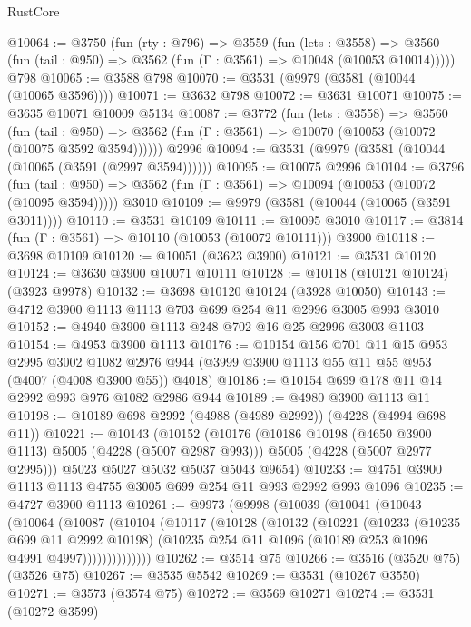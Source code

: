 \begin{lexlean}{RustCore}
\begin{coremodule}
@10064 := @3750
    (fun (rty : @796) =>
    @3559
      (fun (lets : @3558) =>
      @3560 (fun (tail : @950) => @3562 (fun (Γ : @3561) => @10048 (@10053 @10014)))))
    @798
@10065 := @3588 @798
@10070 := @3531 (@9979 (@3581 (@10044 (@10065 @3596))))
@10071 := @3632 @798
@10072 := @3631 @10071
@10075 := @3635 @10071 @10009 @5134
@10087 := @3772
    (fun (lets : @3558) =>
    @3560
      (fun (tail : @950) =>
      @3562 (fun (Γ : @3561) => @10070 (@10053 (@10072 (@10075 @3592 @3594))))))
    @2996
@10094 := @3531 (@9979 (@3581 (@10044 (@10065 (@3591 (@2997 @3594))))))
@10095 := @10075 @2996
@10104 := @3796
    (fun (tail : @950) => @3562 (fun (Γ : @3561) => @10094 (@10053 (@10072 (@10095 @3594)))))
    @3010
@10109 := @9979 (@3581 (@10044 (@10065 (@3591 @3011))))
@10110 := @3531 @10109
@10111 := @10095 @3010
@10117 := @3814 (fun (Γ : @3561) => @10110 (@10053 (@10072 @10111))) @3900
@10118 := @3698 @10109
@10120 := @10051 (@3623 @3900)
@10121 := @3531 @10120
@10124 := @3630 @3900 @10071 @10111
@10128 := @10118 (@10121 @10124) (@3923 @9978)
@10132 := @3698 @10120 @10124 (@3928 @10050)
@10143 := @4712 @3900 @1113 @1113 @703 @699 @254 @11 @2996 @3005 @993 @3010
@10152 := @4940 @3900 @1113 @248 @702 @16 @25 @2996 @3003 @1103
@10154 := @4953 @3900 @1113
@10176 := @10154
    @156
    @701
    @11
    @15
    @953
    @2995
    @3002
    @1082
    @2976
    @944
    (@3999 @3900 @1113 @55 @11 @55 @953 (@4007 (@4008 @3900 @55)) @4018)
@10186 := @10154 @699 @178 @11 @14 @2992 @993 @976 @1082 @2986 @944
@10189 := @4980 @3900 @1113 @11
@10198 := @10189 @698 @2992 (@4988 (@4989 @2992)) (@4228 (@4994 @698 @11))
@10221 := @10143
    (@10152
      (@10176
        (@10186 @10198 (@4650 @3900 @1113) @5005 (@4228 (@5007 @2987 @993)))
        @5005
        (@4228 (@5007 @2977 @2995)))
      @5023
      @5027
      @5032
      @5037
      @5043
      @9654)
@10233 := @4751 @3900 @1113 @1113 @4755 @3005 @699 @254 @11 @993 @2992 @993 @1096
@10235 := @4727 @3900 @1113
@10261 := @9973
    (@9998
      (@10039
        (@10041
          (@10043
            (@10064
              (@10087
                (@10104
                  (@10117
                    (@10128
                      (@10132
                        (@10221
                          (@10233
                            (@10235 @699 @11 @2992 @10198)
                            (@10235 @254 @11 @1096 (@10189 @253 @1096 @4991 @4997))))))))))))))
@10262 := @3514 @75
@10266 := @3516 (@3520 @75) (@3526 @75)
@10267 := @3535 @5542
@10269 := @3531 (@10267 @3550)
@10271 := @3573 (@3574 @75)
@10272 := @3569 @10271
@10274 := @3531 (@10272 @3599)

\end{coremodule}
\end{lexlean}
